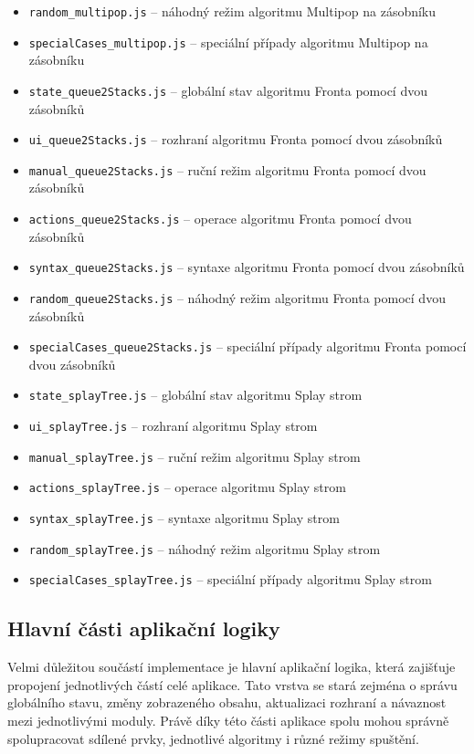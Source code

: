 \begin{itemize}
    \item \texttt{random\_multipop.js} -- náhodný režim algoritmu Multipop na zásobníku
    \item \texttt{specialCases\_multipop.js} -- speciální případy algoritmu Multipop na zásobníku
    \item \texttt{state\_queue2Stacks.js} -- globální stav algoritmu Fronta pomocí dvou zásobníků
    \item \texttt{ui\_queue2Stacks.js} -- rozhraní algoritmu Fronta pomocí dvou zásobníků
    \item \texttt{manual\_queue2Stacks.js} -- ruční režim algoritmu Fronta pomocí dvou zásobníků
    \item \texttt{actions\_queue2Stacks.js} -- operace algoritmu Fronta pomocí dvou zásobníků
    \item \texttt{syntax\_queue2Stacks.js} -- syntaxe algoritmu Fronta pomocí dvou zásobníků
    \item \texttt{random\_queue2Stacks.js} -- náhodný režim algoritmu Fronta pomocí dvou zásobníků
    \item \texttt{specialCases\_queue2Stacks.js} -- speciální případy algoritmu Fronta pomocí dvou zásobníků
    \item \texttt{state\_splayTree.js} -- globální stav algoritmu Splay strom
    \item \texttt{ui\_splayTree.js} -- rozhraní algoritmu Splay strom
    \item \texttt{manual\_splayTree.js} -- ruční režim algoritmu Splay strom
    \item \texttt{actions\_splayTree.js} -- operace algoritmu Splay strom
    \item \texttt{syntax\_splayTree.js} -- syntaxe algoritmu Splay strom
    \item \texttt{random\_splayTree.js} -- náhodný režim algoritmu Splay strom
    \item \texttt{specialCases\_splayTree.js} -- speciální případy algoritmu Splay strom
\end{itemize}

\subsection{Hlavní části aplikační logiky}
Velmi důležitou součástí implementace je hlavní aplikační logika, která zajišťuje propojení jednotlivých částí celé aplikace. Tato vrstva se stará zejména o správu globálního stavu, změny zobrazeného obsahu, aktualizaci rozhraní a návaznost mezi jednotlivými moduly. Právě díky této části aplikace spolu mohou správně spolupracovat sdílené prvky, jednotlivé algoritmy i různé režimy spuštění.

